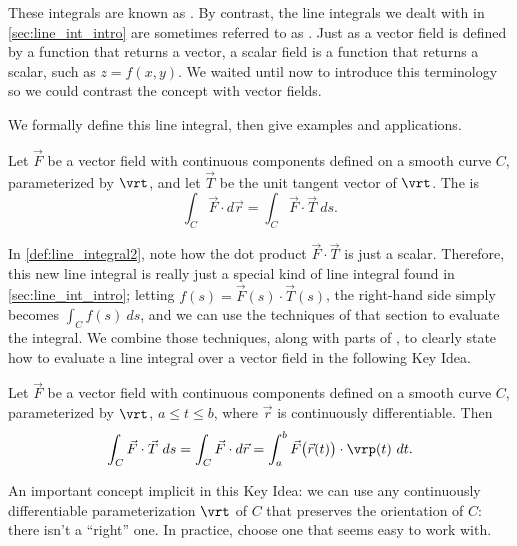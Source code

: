 These integrals are known as . By contrast, the line integrals we dealt with in \autoref{sec:line_int_intro} are sometimes referred to as . Just as a vector field is defined by a function that returns a vector, a scalar field is a function that returns a scalar, such as $z = f(x,y)$. We waited until now to introduce this terminology so we could contrast the concept with vector fields. 

We formally define this line integral, then give examples and applications.

{Let $\vec F$ be a vector field with continuous components defined on a smooth curve $C$, parameterized by $\vrt$, and let $\vec T$ be the unit tangent vector of $\vrt$. The  is
\[\int_C \vec F\cdot d\vec r = \int_C \vec F\cdot\vec T\ ds.\]}


In \autoref{def:line_integral2}, note how the dot product $\vec F \cdot \vec T$ is just a scalar. %
Therefore, this new line integral is really just a special kind of line integral found in \autoref{sec:line_int_intro}; letting $f(s) = \vec F(s)\cdot \vec T(s)$, the right-hand side simply becomes $\int_C f(s)\ ds$, and we can use the techniques of that section to evaluate the integral. We combine those techniques, along with parts of , to clearly state how to evaluate a line integral over a vector field in the following Key Idea. 

{Let $\vec F$ be a vector field with continuous components defined on a smooth curve $C$, parameterized by $\vrt$, $a\leq t\leq b$, where $\vec r$ is continuously differentiable. Then
	\[
	\int_C\vec F\cdot\vec T\ ds = \int_C \vec F\cdot d\vec r
	=\int_a^b \vec F\big(\vec r(t)\big) \cdot \vrp(t)\ dt.
	\]}

An important concept implicit in this Key Idea: we can use any continuously differentiable parameterization $\vrt$ of $C$ that preserves the orientation of $C$: there isn't a ``right'' one. In practice, choose one that seems easy to work with. 

